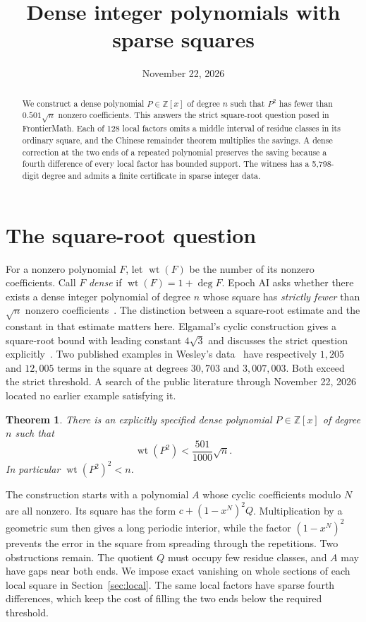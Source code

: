 \documentclass[10pt,a4paper,reqno]{amsart}
\title[Dense polynomials with sparse squares]{Dense integer polynomials with sparse squares}
\date{November 22, 2026}
\newtheorem{theorem}{Theorem}
\newcommand{\wt}{\operatorname{wt}}
\newcommand{\ZZ}{\mathbb Z}
\begin{document}
\begin{abstract}
We construct a dense polynomial $P\in\ZZ[x]$ of degree $n$ such that $P^2$ has fewer than $0.501\sqrt n$ nonzero coefficients. This answers the strict square-root question posed in FrontierMath. Each of 128 local factors omits a middle interval of residue classes in its ordinary square, and the Chinese remainder theorem multiplies the savings. A dense correction at the two ends of a repeated polynomial preserves the saving because a fourth difference of every local factor has bounded support. The witness has a 5,798-digit degree and admits a finite certificate in sparse integer data.
\end{abstract}
\maketitle

\section{The square-root question}
For a nonzero polynomial $F$, let $\wt(F)$ be the number of its nonzero coefficients. Call $F$ \emph{dense} if $\wt(F)=1+\deg F$. Epoch AI asks whether there exists a dense integer polynomial of degree $n$ whose square has \emph{strictly fewer} than $\sqrt n$ nonzero coefficients~\cite{epoch}. The distinction between a square-root estimate and the constant in that estimate matters here. Elgamal's cyclic construction gives a square-root bound with leading constant $4\sqrt3$ and discusses the strict question explicitly~\cite{elgamal}. Two published examples in Wesley's data~\cite{wesley} have respectively $1{,}205$ and $12{,}005$ terms in the square at degrees $30{,}703$ and $3{,}007{,}003$. Both exceed the strict threshold. A search of the public literature through November 22, 2026 located no earlier example satisfying it.

\begin{theorem}\label{main}
There is an explicitly specified dense polynomial $P\in\ZZ[x]$ of degree $n$ such that
\[
                \wt(P^2)<\frac{501}{1000}\sqrt n.
\]
In particular $\wt(P^2)^2<n$.
\end{theorem}

The construction starts with a polynomial $A$ whose cyclic coefficients modulo $N$ are all nonzero. Its square has the form $c+(1-x^N)^2Q$. Multiplication by a geometric sum then gives a long periodic interior, while the factor $(1-x^N)^2$ prevents the error in the square from spreading through the repetitions. Two obstructions remain. The quotient $Q$ must occupy few residue classes, and $A$ may have gaps near both ends. We impose exact vanishing on whole sections of each local square in Section~\ref{sec:local}. The same local factors have sparse fourth differences, which keep the cost of filling the two ends below the required threshold.
\end{document}
